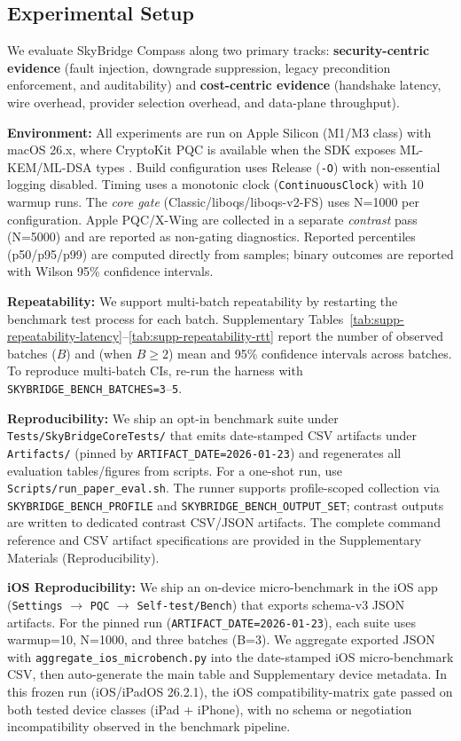 \documentclass[10pt,journal,compsoc]{IEEEtran}
\newcommand{\artifactdate}{2026-01-23}
\begin{document}
\subsection{Experimental Setup}\label{a.-experimental-setup}

We evaluate SkyBridge Compass along two primary tracks:
\textbf{security-centric evidence} (fault injection, downgrade
suppression, legacy precondition enforcement, and auditability) and
\textbf{cost-centric evidence} (handshake latency, wire overhead,
provider selection overhead, and data-plane throughput).

\textbf{Environment:} All experiments are run on Apple Silicon (M1/M3 class) with macOS 26.x, where CryptoKit PQC is available when the SDK exposes ML-KEM/ML-DSA types \cite{ref1,ref34}. Build configuration uses Release (\texttt{-O}) with non-essential logging disabled. Timing uses a monotonic clock (\texttt{ContinuousClock}) with 10 warmup runs. The \emph{core gate} (Classic/liboqs/liboqs-v2-FS) uses N=1000 per configuration. Apple PQC/X-Wing are collected in a separate \emph{contrast} pass (N=5000) and are reported as non-gating diagnostics. Reported percentiles (p50/p95/p99) are computed directly from samples; binary outcomes are reported with Wilson 95\% confidence intervals.

\textbf{Repeatability:} We support multi-batch repeatability by
restarting the benchmark test process for each batch. Supplementary
Tables~\ref{tab:supp-repeatability-latency}--\ref{tab:supp-repeatability-rtt}
report the number of observed batches ($B$) and (when $B \ge 2$) mean and
95\% confidence intervals across batches. To reproduce multi-batch CIs,
re-run the harness with \texttt{SKYBRIDGE\_BENCH\_BATCHES=3}--\texttt{5}.

\textbf{Reproducibility:} We ship an opt-in benchmark suite under \texttt{Tests/\allowbreak SkyBridgeCoreTests/} that emits date-stamped CSV artifacts under \texttt{Artifacts/} (pinned by \texttt{ARTIFACT\_DATE=\artifactdate}) and regenerates all evaluation tables/figures from scripts. For a one-shot run, use \texttt{Scripts/\allowbreak run\_\allowbreak paper\_\allowbreak eval.sh}. The runner supports profile-scoped collection via \texttt{SKYBRIDGE\_BENCH\_PROFILE} and \texttt{SKYBRIDGE\_BENCH\_OUTPUT\_SET}; contrast outputs are written to dedicated contrast CSV/JSON artifacts. The complete command reference and CSV artifact specifications are provided in the Supplementary Materials (Reproducibility).

\textbf{iOS Reproducibility:} We ship an on-device micro-benchmark in
the iOS app (\texttt{Settings} $\rightarrow$ \texttt{PQC} $\rightarrow$
\texttt{Self-test/Bench}) that exports schema-v3 JSON artifacts.
For the pinned run (\texttt{ARTIFACT\_DATE=\artifactdate}), each suite uses
warmup=10, N=1000, and three batches (B=3). We aggregate exported JSON
with \texttt{aggregate\_ios\_microbench.py} into the date-stamped iOS
micro-benchmark CSV, then auto-generate the main table and Supplementary
device metadata. In this frozen run
(iOS/iPadOS 26.2.1), the iOS compatibility-matrix gate passed on both
tested device classes (iPad + iPhone), with no schema or negotiation
incompatibility observed in the benchmark pipeline.
\end{document}
